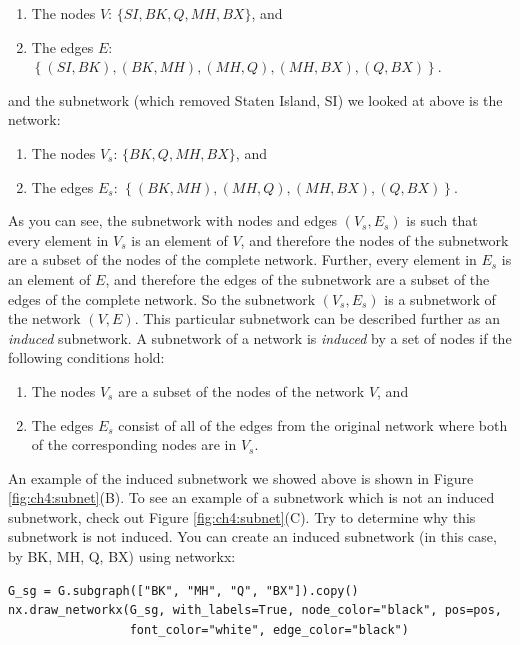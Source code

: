 \begin{enumerate}
    \item The nodes $V$: $\{SI, BK, Q, MH, BX\}$, and
    \item The edges $E$: $\left\{(SI, BK), (BK, MH), (MH, Q), (MH, BX), (Q, BX)\right\}$.
\end{enumerate}

and the subnetwork (which removed Staten Island, SI) we looked at above is the network:

\begin{enumerate}
    \item The nodes $V_s$: $\{BK, Q, MH, BX\}$, and
    \item The edges $E_s$: $\left\{(BK, MH), (MH, Q), (MH, BX), (Q, BX)\right\}$.
\end{enumerate}

As you can see, the subnetwork with nodes and edges $(V_s, E_s)$ is such that every element in $V_s$ is an element of $V$, and therefore the nodes of the subnetwork are a subset of the nodes of the complete network. Further, every element in $E_s$ is an element of $E$, and therefore the edges of the subnetwork are a subset of the edges of the complete network. So the subnetwork $(V_s, E_s)$ is a subnetwork of the network $(V, E)$. This particular subnetwork can be described further as an \textit{induced} subnetwork. A subnetwork of a network is \textit{induced} by a set of nodes if the following conditions hold:

\begin{enumerate}
    \item The nodes $V_s$ are a subset of the nodes of the network $V$, and
    \item The edges $E_s$ consist of {all} of the edges from the original network where both of the corresponding nodes are in $V_s$.
\end{enumerate} 

An example of the induced subnetwork we showed above is shown in Figure \ref{fig:ch4:subnet}(B). To see an example of a subnetwork which is {not} an induced subnetwork, check out Figure \ref{fig:ch4:subnet}(C). Try to determine why this subnetwork is not induced. You can create an induced subnetwork (in this case, by BK, MH, Q, BX) using networkx:

\begin{lstlisting}[style=python]
G_sg = G.subgraph(["BK", "MH", "Q", "BX"]).copy()
nx.draw_networkx(G_sg, with_labels=True, node_color="black", pos=pos,
                 font_color="white", edge_color="black")
\end{lstlisting}

